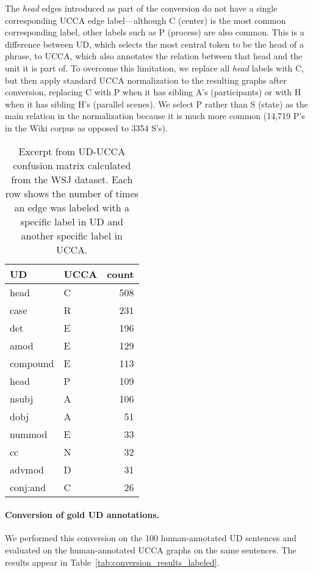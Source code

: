 \documentclass[11pt,a4paper]{article}
\begin{document}
The \textit{head} edges introduced as part of the conversion do not have a single
corresponding UCCA edge label---although C (center) is the most common corresponding label,
other labels such as P (process) are also common.
This is a difference between UD, which selects the most central token to be the head of a phrase,
to UCCA, which also annotates the relation between that head and the unit it is part of.
To overcome this limitation, we replace all \textit{head} labels with C, but then
apply standard UCCA normalization to the resulting graphs after conversion,
replacing C with P when it has sibling A's (participants) or
with H when it has sibling H's (parallel scenes).
We select P rather than S (state) as the main relation in the normalization because
it is much more common (14,719 P's in the Wiki corpus as opposed to 3354 S's).

\begin{table}[t]
\centering
\begin{tabular}{ll|r}
UD & UCCA & count \\
\hline
head & C & 508 \\
case & R & 231 \\
det & E & 196 \\ 
amod & E & 129 \\
compound & E & 113 \\
head & P & 109 \\
nsubj & A & 106 \\
dobj & A & 51 \\
nummod & E & 33 \\
cc & N & 32 \\
advmod & D & 31 \\
conj:and & C & 26
\end{tabular}
\caption{Excerpt from UD-UCCA confusion matrix calculated from the WSJ dataset.
Each row shows the number of times an edge was labeled with a specific label in UD
and another specific label in UCCA.\label{tab:confusion_matrix}}
\end{table}

\paragraph{Conversion of gold UD annotations.}

We performed this conversion on the 100 human-annotated UD sentences
and evaluated on the human-annotated UCCA graphs on the same sentences.
The results appear in Table~\ref{tab:conversion_results_labeled}.
\end{document}
